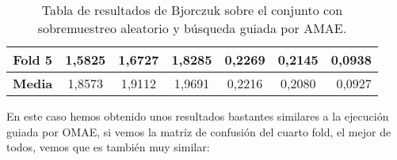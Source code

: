 \begin{table}[H]
{\begin{tabular}{|crrrrrr|}
\multicolumn{1}{|c|}{\textbf{Fold 5}} & \multicolumn{1}{c|}{1,5825}           & \multicolumn{1}{c|}{1,6727}             & \multicolumn{1}{c|}{1,8285}          & \multicolumn{1}{c|}{0,2269}            & \multicolumn{1}{c|}{0,2145}              & 0,0938                             \\ \hline
\multicolumn{1}{|c|}{\textbf{Media}} & \multicolumn{1}{c|}{1,8573}           & \multicolumn{1}{c|}{1,9112}             & \multicolumn{1}{c|}{1,9691}          & \multicolumn{1}{c|}{0,2216}            & \multicolumn{1}{c|}{0,2080}              & 0,0927                             \\ \hline
\end{tabular}%
}
\caption{Tabla de resultados de Bjorczuk sobre el conjunto con sobremuestreo aleatorio y búsqueda guiada por AMAE.}\label{tablaBJORCZUKconAMAE}
\end{table}


En este caso hemos obtenido unos resultados bastantes similares a la ejecución guiada por OMAE, si vemos la matriz de confusión del cuarto fold, el mejor de todos, vemos que es también muy similar:

